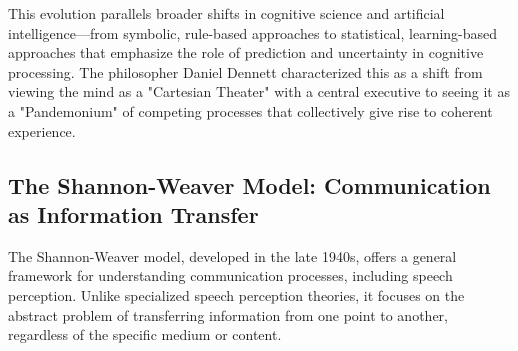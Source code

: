 \documentclass[12pt,a4paper]{article}
\begin{document}
This evolution parallels broader shifts in cognitive science and artificial intelligence—from symbolic, rule-based approaches to statistical, learning-based approaches that emphasize the role of prediction and uncertainty in cognitive processing. The philosopher Daniel Dennett characterized this as a shift from viewing the mind as a "Cartesian Theater" with a central executive to seeing it as a "Pandemonium" of competing processes that collectively give rise to coherent experience.

\subsection{The Shannon-Weaver Model: Communication as Information Transfer}

The Shannon-Weaver model, developed in the late 1940s, offers a general framework for understanding communication processes, including speech perception. Unlike specialized speech perception theories, it focuses on the abstract problem of transferring information from one point to another, regardless of the specific medium or content.
\end{document}
